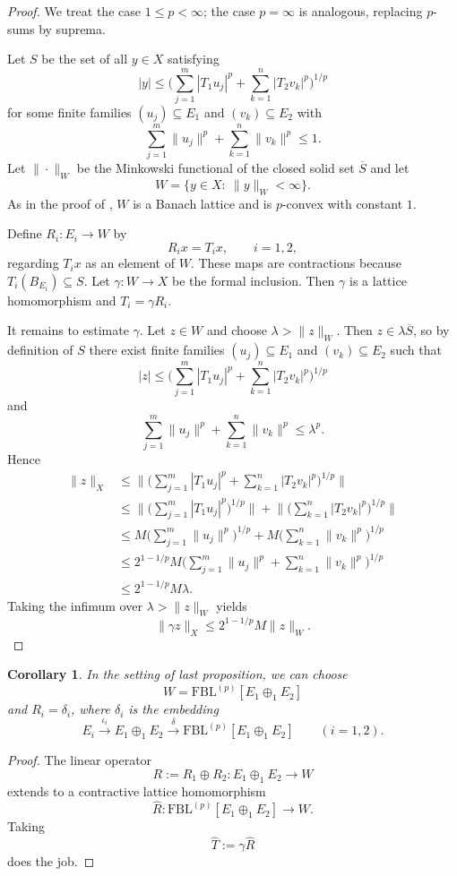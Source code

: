 \documentclass[12pt]{amsart}
\newcommand{\FBL}{\mathrm{FBL}}
\theoremstyle{plain}
\newtheorem{corollary}[theorem]{Corollary}
\theoremstyle{definition}
\begin{document}
\begin{proof}
We treat the case $1\leq p<\infty$; the case $p=\infty$ is analogous, replacing $p$-sums by suprema.

Let $S$ be the set of all $y\in X$ satisfying
\[
|y|\leq
\Big(\sum_{j=1}^m |T_1u_j|^p+\sum_{k=1}^n |T_2v_k|^p\Big)^{1/p}
\]
for some finite families $(u_j)\subseteq E_1$ and $(v_k)\subseteq E_2$ with
\[
\sum_{j=1}^m\|u_j\|^p+\sum_{k=1}^n\|v_k\|^p\leq 1.
\]
Let $\|\cdot\|_W$ be the Minkowski functional of the closed solid set $\overline{S}$ and let
\[
W=\{y\in X:\ \|y\|_W<\infty\}.
\]
As in the proof of \cite[Theorem~3]{factorpconvex}, $W$ is a Banach lattice and is $p$-convex with constant $1$.

Define $R_i:E_i\to W$ by
\[
R_i x=T_i x,
\qquad i=1,2,
\]
regarding $T_i x$ as an element of $W$. These maps are contractions because $T_i(B_{E_i})\subseteq S$. Let $\gamma:W\to X$ be the formal inclusion. Then $\gamma$ is a lattice homomorphism and $T_i=\gamma R_i$.

It remains to estimate $\gamma$. Let $z\in W$ and choose $\lambda>\|z\|_W$. Then $z\in \lambda \overline{S}$, so by definition of $S$ there exist finite families $(u_j)\subseteq E_1$ and $(v_k)\subseteq E_2$ such that
\[
|z|\leq
\Big(\sum_{j=1}^m |T_1u_j|^p+\sum_{k=1}^n |T_2v_k|^p\Big)^{1/p}
\]
and
\[
\sum_{j=1}^m\|u_j\|^p+\sum_{k=1}^n\|v_k\|^p\leq \lambda^p.
\]
Hence
\begin{align*}
\|z\|_X
&\leq
\Big\|
\Big(\sum_{j=1}^m |T_1u_j|^p+\sum_{k=1}^n |T_2v_k|^p\Big)^{1/p}
\Big\| \\
&\leq
\Big\|\Big(\sum_{j=1}^m |T_1u_j|^p\Big)^{1/p}\Big\|
+
\Big\|\Big(\sum_{k=1}^n |T_2v_k|^p\Big)^{1/p}\Big\| \\
&\leq
M\Big(\sum_{j=1}^m \|u_j\|^p\Big)^{1/p}
+
M\Big(\sum_{k=1}^n \|v_k\|^p\Big)^{1/p} \\
&\leq
2^{1-1/p}M
\Big(
\sum_{j=1}^m \|u_j\|^p+\sum_{k=1}^n \|v_k\|^p
\Big)^{1/p} \\
&\leq 2^{1-1/p}M\lambda.
\end{align*}
Taking the infimum over $\lambda>\|z\|_W$ yields
\[
\|\gamma z\|_X\leq 2^{1-1/p}M\|z\|_W.
\]
\end{proof}

\begin{corollary}\label{corollary:factFPLp} In the setting of last proposition, we can choose \[
W=\FBL^{(p)}[E_1\oplus_1E_2] 
\]
and 
$R_i=\delta_i$, where $\delta_i$ is the embedding 
\[
E_i\overset{\iota_i}{\rightarrow}E_1\oplus_1E_2\overset{\delta}{\rightarrow} \FBL^{(p)}[E_1\oplus_1 E_2] \qquad (i=1,2).
\]

\end{corollary}
\begin{proof}
The linear operator 
\[
R:=R_1\oplus R_2:E_1\oplus_1 E_2\rightarrow W
\]
extends to a contractive lattice homomorphism
\[
\widehat{R}:\FBL^{(p)}[E_1\oplus_1 E_2]\rightarrow W.
\]
Taking \[
\widehat T:=\gamma\widehat R
\]
does the job.
\end{proof}
\end{document}
